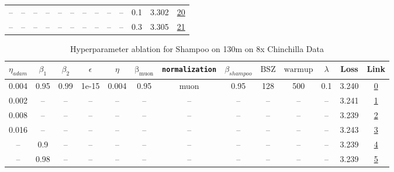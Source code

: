 \begin{table}[H]
\begin{tabular}{ccccccccccccc}
-- & -- & -- & -- & -- & -- & -- & -- & -- & -- & 0.1 & 3.302 & \href{https://wandb.ai/stanford-mercury/optimizer-scaling/runs/sweep-130m-10B-mudamh215ad7lr0.004-alr0.008-wd0.1-minlr0-warmup5-a10de9}{20} \\
-- & -- & -- & -- & -- & -- & -- & -- & -- & -- & 0.3 & 3.305 & \href{https://wandb.ai/stanford-mercury/optimizer-scaling/runs/sweep-130m-10B-mudamh26ce34lr0.004-alr0.008-wd0.3-minlr0-warmup5-8441eb}{21} \\
\bottomrule
\end{tabular}
\end{table}

\begin{table}[H]
\centering
\caption{Hyperparameter ablation for Shampoo on 130m on 8x Chinchilla Data}
\label{tab:ablation_shampoo_130m_8}
\begin{tabular}{ccccccccccccc}
\toprule
$\eta_{adam}$ & $\beta_1$ & $\beta_2$ & $\epsilon$ & $\eta$ & $\mathrm{\beta_{muon}}$ & \texttt{normalization} & $\beta_{shampoo}$ & $\mathrm{BSZ}$ & $\mathrm{warmup}$ & $\lambda$ & Loss & Link \\
\midrule
0.004 & 0.95 & 0.99 & 1e-15 & 0.004 & 0.95 & muon & 0.95 & 128 & 500 & 0.1 & 3.240 & \href{https://wandb.ai/stanford-mercury/optimizer-scaling/runs/sweep-130m-21B-mudamk138b15lr0.004-alr0.004-wd0.1-minlr0-warmup5-239972}{0} \\
\midrule
0.002 & -- & -- & -- & -- & -- & -- & -- & -- & -- & -- & 3.241 & \href{https://wandb.ai/stanford-mercury/optimizer-scaling/runs/sweep-130m-21B-mudamv26ac19lr0.004-alr0.002-wd0.1-minlr0-warmup5-5905e2}{1} \\
0.008 & -- & -- & -- & -- & -- & -- & -- & -- & -- & -- & 3.239 & \href{https://wandb.ai/stanford-mercury/optimizer-scaling/runs/sweep-130m-21B-mudamv9c90fdlr0.004-alr0.008-wd0.1-minlr0-warmup5-684d36}{2} \\
0.016 & -- & -- & -- & -- & -- & -- & -- & -- & -- & -- & 3.243 & \href{https://wandb.ai/stanford-mercury/optimizer-scaling/runs/sweep-130m-21B-mudamv0a167flr0.004-alr0.016-wd0.1-minlr0-warmup5-f41317}{3} \\
-- & 0.9 & -- & -- & -- & -- & -- & -- & -- & -- & -- & 3.239 & \href{https://wandb.ai/stanford-mercury/optimizer-scaling/runs/sweep-130m-21B-mudamvc0c6b9lr0.004-alr0.004-wd0.1-minlr0-warmup5-6ebcb4}{4} \\
-- & 0.98 & -- & -- & -- & -- & -- & -- & -- & -- & -- & 3.239 & \href{https://wandb.ai/stanford-mercury/optimizer-scaling/runs/sweep-130m-21B-mudamvc8ffa7lr0.004-alr0.004-wd0.1-minlr0-warmup5-9f4a73}{5} \\

\end{tabular}
\end{table}
